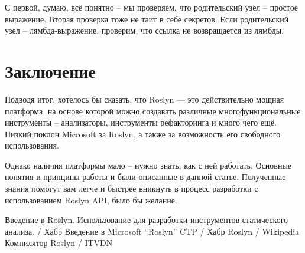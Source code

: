 \documentclass{article}
\begin{document}
С первой, думаю, всё понятно – мы проверяем, что родительский узел – простое выражение. Вторая проверка тоже не таит в себе секретов. Если родительский узел – лямбда-выражение, проверим, что ссылка не возвращается из лямбды.

\section{Заключение}
Подводя итог, хотелось бы сказать, что Roslyn — это действительно мощная платформа, на основе которой можно создавать различные многофункциональные инструменты – анализаторы, инструменты рефакторинга и много чего ещё. Низкий поклон Microsoft за Roslyn, а также за возможность его свободного использования.

Однако наличия платформы мало – нужно знать, как с ней работать. Основные понятия и принципы работы и были описанные в данной статье. Полученные знания помогут вам легче и быстрее вникнуть в процесс разработки с использованием Roslyn API, было бы желание.
\newpage
\begin{thebibliography}{99}

\bibitem{} Введение в Roslyn. Использование для разработки инструментов статического анализа. / Хабр
\bibitem{} Введение в Microsoft “Roslyn” CTP / Хабр
\bibitem{} Roslyn / Wikipedia
\bibitem{} Компилятор Roslyn / ITVDN
\end{thebibliography}
\end{document}
